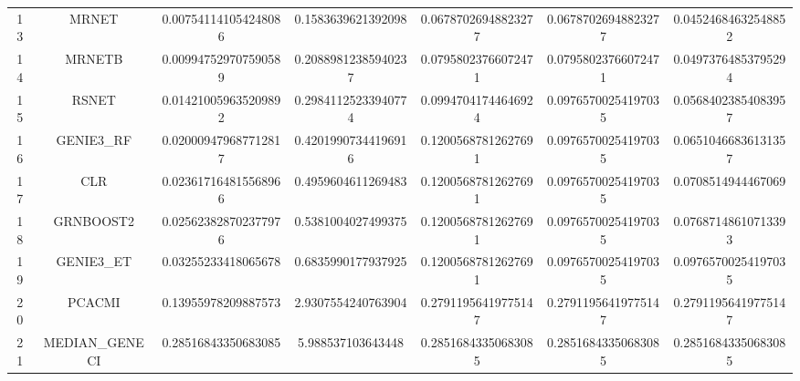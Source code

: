 \documentclass[a4paper,10pt]{article}
\begin{document}
\begin{landscape}
\begin{table}[!htp]
\begin{tabular}{ccccccc}
13&MRNET&0.007541141054248086&0.1583639621392098&0.06787026948823277&0.06787026948823277&0.04524684632548852\\
14&MRNETB&0.009947529707590589&0.20889812385940237&0.07958023766072471&0.07958023766072471&0.04973764853795294\\
15&RSNET&0.014210059635209892&0.29841125233940774&0.09947041744646924&0.09765700254197035&0.05684023854083957\\
16&GENIE3_RF&0.020009479687712817&0.42019907344196916&0.12005687812627691&0.09765700254197035&0.06510466836131357\\
17&CLR&0.023617164815568966&0.4959604611269483&0.12005687812627691&0.09765700254197035&0.0708514944467069\\
18&GRNBOOST2&0.025623828702377976&0.5381004027499375&0.12005687812627691&0.09765700254197035&0.07687148610713393\\
19&GENIE3_ET&0.03255233418065678&0.6835990177937925&0.12005687812627691&0.09765700254197035&0.09765700254197035\\
20&PCACMI&0.13955978209887573&2.9307554240763904&0.27911956419775147&0.27911956419775147&0.27911956419775147\\
21&MEDIAN_GENECI&0.28516843350683085&5.988537103643448&0.28516843350683085&0.28516843350683085&0.28516843350683085\\
\hline
\end{tabular}
\end{table}


\end{landscape}
\end{document}
